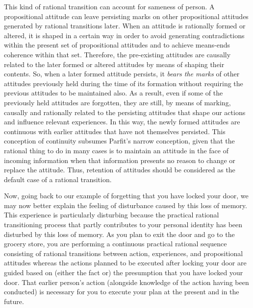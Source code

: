 This kind of rational transition can account for sameness of person. A
propositional attitude can leave persisting marks on other propositional
attitudes generated by rational transitions later. When an attitude is
rationally formed or altered, it is shaped in a certain way in order to
avoid generating contradictions within the present set of propositional
attitudes and to achieve means-ends coherence within that set.
Therefore, the pre-existing attitudes are causally related to the later
formed or altered attitudes by means of shaping their contents. So, when
a later formed attitude persists, it \emph{bears the marks} of other
attitudes previously held during the time of its formation without 
requiring the previous attitudes to be maintained also. As a result,
even if some of the previously held attitudes are forgotten, they are
still, by means of marking, causally and rationally related to the
persisting attitudes that shape our actions and influence relevant
experiences. In this way, the newly formed attitudes are continuous with
earlier attitudes that have not themselves persisted. This conception of
continuity subsumes Parfit's narrow conception, given that the rational
thing to do in many cases is to maintain an attitude in the face of
incoming information when that information presents no reason to change
or replace the attitude. Thus, retention of attitudes should be
considered as the default case of a rational transition.

Now, going back to our example of forgetting that you have locked your
door, we may now better explain the feeling of disturbance caused by
this loss of memory. This experience is particularly disturbing because
the practical rational transitioning process that partly contributes to
your personal identity has been disturbed by this loss of memory. As you
plan to exit the door and go to the grocery store, you are performing a
continuous practical rational sequence consisting of rational
transitions between action, experiences, and propositional attitudes
whereas the actions planned to be executed after locking your door are
guided based on (either the fact or) the presumption that you have
locked your door. That earlier person's action (alongside knowledge of
the action having been conducted) is necessary for you to execute your
plan at the present and in the future.


